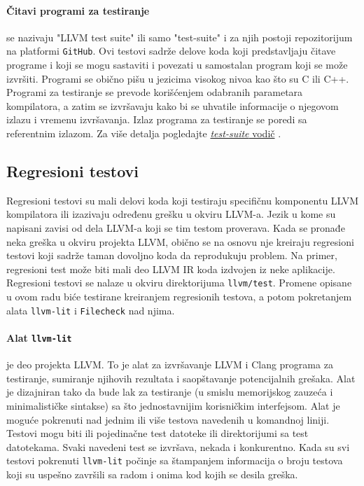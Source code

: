 \documentclass[12pt,oneside]{memoir}
\begin{document}
\paragraph{Čitavi programi za testiranje} se nazivaju "LLVM test suite" ili samo "test-suite" i za njih postoji repozitorijum na platformi \texttt{GitHub}. 
Ovi testovi sadrže delove koda koji predstavljaju čitave programe i koji se mogu sastaviti i povezati u samostalan program koji se može izvršiti. Programi se obično pišu u jezicima visokog nivoa kao što su C ili C++.
Programi za testiranje se prevode korišćenjem odabranih parametara kompilatora, a zatim se izvršavaju kako bi se uhvatile informacije o njegovom izlazu i vremenu izvršavanja. Izlaz programa za testiranje se poredi sa referentnim izlazom. Za više detalja pogledajte \href{https://www.llvm.org/docs/TestSuiteGuide.html}{\textit{test-suite} vodič} \cite{test_suite}.

\subsection{Regresioni testovi}
{Regresioni testovi} su mali delovi koda koji testiraju specifičnu komponentu LLVM kompilatora ili izazivaju određenu grešku u okviru LLVM-a. Jezik u kome su napisani zavisi od dela LLVM-a koji se tim testom proverava. 
Kada se pronađe neka greška u okviru projekta LLVM, obično se na osnovu nje kreiraju regresioni testovi koji sadrže taman dovoljno koda da reprodukuju problem. %
Na primer, regresioni test može biti mali deo LLVM IR koda izdvojen iz neke aplikacije. %
Regresioni testovi se nalaze u okviru direktorijuma \texttt{llvm/test}.
Promene opisane u ovom radu biće testirane kreiranjem regresionih testova, a potom pokretanjem alata \texttt{llvm-lit} \cite{lit} i \texttt{Filecheck} \cite{filecheck} nad njima.

\paragraph{Alat \texttt{llvm-lit}} je deo projekta LLVM.  To je alat za izvršavanje LLVM i Clang programa za testiranje, sumiranje njihovih rezultata i saopštavanje potencijalnih grešaka. Alat je dizajniran tako da bude lak za testiranje (u smislu memorijskog zauzeća i minimalističke sintakse) sa što jednostavnijim korisničkim interfejsom. Alat je moguće pokrenuti nad jednim ili više testova navedenih u komandnoj liniji. Testovi mogu biti ili pojedinačne test datoteke ili direktorijumi sa test datotekama. Svaki navedeni test se izvršava, nekada i konkurentno. Kada su svi testovi pokrenuti \texttt{llvm-lit} počinje sa štampanjem informacija o broju testova koji su uspešno završili sa radom i onima kod kojih se desila greška.
\end{document}
